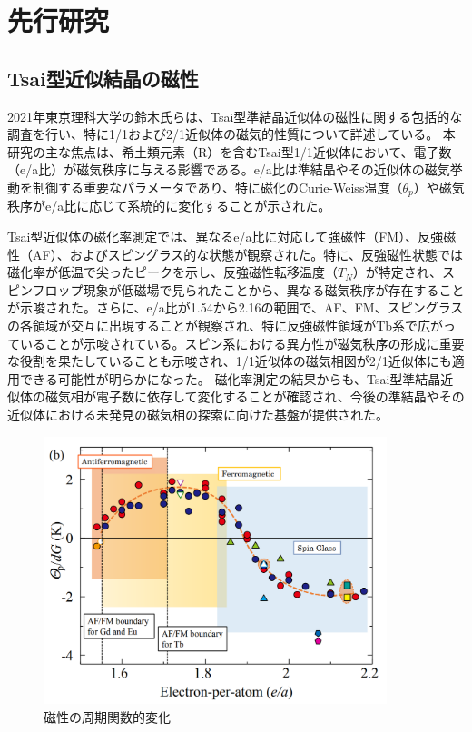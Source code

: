 \documentclass[11pt,a4j]{jreport}
\begin{document}
\chapter{先行研究}
\section{Tsai型近似結晶の磁性}
2021年東京理科大学の鈴木氏らは、Tsai型準結晶近似体の磁性に関する包括的な調査を行い、特に1/1および2/1近似体の磁気的性質について詳述している。
本研究の主な焦点は、希土類元素（R）を含むTsai型1/1近似体において、電子数（e/a比）が磁気秩序に与える影響である。e/a比は準結晶やその近似体の磁気挙動を制御する重要なパラメータであり、特に磁化のCurie-Weiss温度（$\theta_p$）や磁気秩序がe/a比に応じて系統的に変化することが示された。\par
Tsai型近似体の磁化率測定では、異なるe/a比に対応して強磁性（FM）、反強磁性（AF）、およびスピングラス的な状態が観察された。特に、反強磁性状態では磁化率が低温で尖ったピークを示し、反強磁性転移温度（$T_N$）が特定され、スピンフロップ現象が低磁場で見られたことから、異なる磁気秩序が存在することが示唆された。さらに、e/a比が1.54から2.16の範囲で、AF、FM、スピングラスの各領域が交互に出現することが観察され、特に反強磁性領域がTb系で広がっていることが示唆されている。スピン系における異方性が磁気秩序の形成に重要な役割を果たしていることも示唆され、1/1近似体の磁気相図が2/1近似体にも適用できる可能性が明らかになった。
磁化率測定の結果からも、Tsai型準結晶近似体の磁気相が電子数に依存して変化することが確認され、今後の準結晶やその近似体における未発見の磁気相の探索に向けた基盤が提供された。
\begin{figure}[htbp]
  \centering
  \vspace{10mm}
  \includegraphics[width=100mm]{./figure/e_a.png}
  \caption{磁性の周期関数的変化}
  \label{e_a}
\end{figure}
\end{document}
